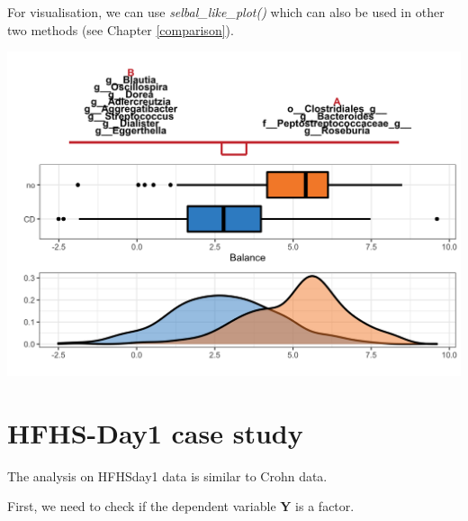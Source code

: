 \documentclass[openany]{book}
\newenvironment{Shaded}{\begin{snugshade}}{\end{snugshade}}
\newcommand{\KeywordTok}[1]{\textcolor[rgb]{0.13,0.29,0.53}{\textbf{#1}}}
\newcommand{\DataTypeTok}[1]{\textcolor[rgb]{0.13,0.29,0.53}{#1}}
\newcommand{\StringTok}[1]{\textcolor[rgb]{0.31,0.60,0.02}{#1}}
\newcommand{\OtherTok}[1]{\textcolor[rgb]{0.56,0.35,0.01}{#1}}
\newcommand{\OperatorTok}[1]{\textcolor[rgb]{0.81,0.36,0.00}{\textbf{#1}}}
\newcommand{\NormalTok}[1]{#1}
\begin{document}
For visualisation, we can use \emph{selbal\_like\_plot()} which can also
be used in other two methods (see Chapter \ref{comparison}).

\begin{Shaded}
\end{Shaded}

\begin{center}\includegraphics[width=1\linewidth]{./Generated_plots/unnamed-chunk-18-1} \end{center}

\section{HFHS-Day1 case study}\label{hfhs-day1-case-study}

The analysis on HFHSday1 data is similar to Crohn data.

First, we need to check if the dependent variable \textbf{Y} is a
factor.
\end{document}

